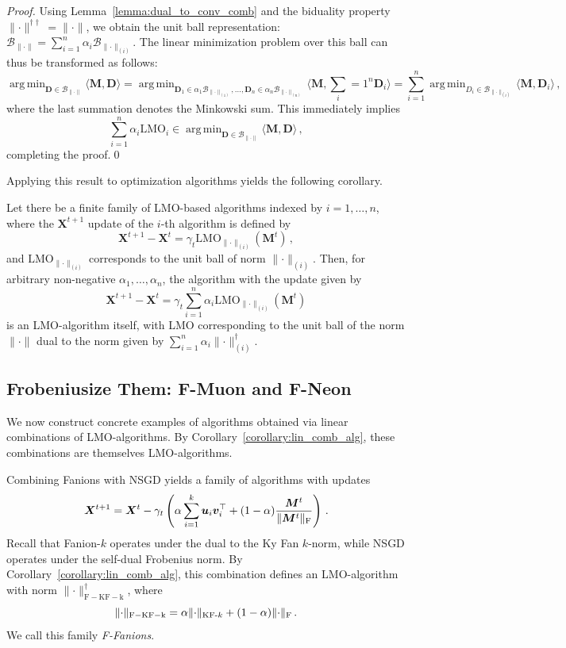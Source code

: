 \documentclass[smallextended,referee,envcountsect]{svjour3}
\def\vu{{\bm{u}}}
\def\vv{{\bm{v}}}
\def\mD{{\bm{D}}}
\def\mM{{\bm{M}}}
\def\mX{{\bm{X}}}
\DeclareMathOperator*{\argmin}{arg\,min}
\newcommand{\cB}{\mathcal{B}}
\newcommand{\norm}[1]{\lVert #1\rVert}
\DeclarePairedDelimiter{\normf}{\|}{\|_\mathrm{F}}
\DeclarePairedDelimiter{\normkfk}{\|}{\|_{\text{KF-}k}}
\def\<#1,#2>{\langle #1,#2\rangle}
\newcommand{\lemmaref}[1]{Lemma~\ref{#1}}
\newcommand{\corollaryref}[1]{Corollary~\ref{#1}}
\begin{document}
 \begin{proof}
   Using \lemmaref{lemma:dual_to_conv_comb} and the biduality property $\norm{\cdot}^{\dagger \dagger} = \norm{\cdot}$, we obtain the unit ball representation: $\cB_{\norm{\cdot}} = \sum_{i = 1}^n \alpha_i \cB_{\norm{\cdot}_{(i)}}$. The linear minimization problem over this ball can thus be transformed as follows:
   \[
   \argmin_{\mD \in \cB_{\norm{\cdot}}}\<\mM, \mD> = \argmin_{\mD_1 \in \alpha_1 \cB_{\norm{\cdot}_{(1)}}, \dots, \mD_n \in \alpha_n\cB_{\norm{\cdot}_{(n)}}}\<\mM, \sum_{i = 1}^n\mD_i> = \sum_{i = 1}^n \argmin_{D_i \in \cB_{\norm{\cdot}_{(i)}}}\<\mM, \mD_i>\,,
   \]
   where the last summation denotes the Minkowski sum. This immediately implies 
   \[
   \sum_{i = 1}^n \alpha_i \mathrm{LMO}_{i} \in \argmin_{\mD \in \cB_{\norm{\cdot}}}\<\mM, \mD>\,,
   \] 
   completing the proof.\qed
\end{proof}
 
 Applying this result to optimization algorithms yields the following corollary.
 
 \begin{corollary}\label{corollary:lin_comb_alg}
  Let there be a finite family of LMO-based algorithms indexed by $i = 1, \dots, n$, where the $\mX^{t + 1}$ update of the $i$-th algorithm is defined by
  \[
  \mX^{t + 1} - \mX^{t} = \gamma_t \mathrm{LMO}_{\norm{\cdot}_{(i)}}(\mM^{t})\,,
  \]
  and $\mathrm{LMO}_{\norm{\cdot}_{(i)}}$ corresponds to the unit ball of norm $\norm{\cdot}_{(i)}$. Then, for arbitrary non-negative $\alpha_1, \dots, \alpha_n$, the algorithm with the update given by
  \[
  \mX^{t + 1} - \mX^{t} = \gamma_t \sum_{i = 1}^n \alpha_i \mathrm{LMO}_{\norm{\cdot}_{(i)}}(\mM^t)
  \]
  is an LMO-algorithm itself, with LMO corresponding to the unit ball of the norm $\norm{\cdot}$ dual to the norm given by $\sum_{i = 1}^n \alpha_i \norm{\cdot}_{(i)}^\dagger$.
\end{corollary}
 
 \subsection{Frobeniusize Them: F-Muon and F-Neon}
 We now construct concrete examples of algorithms obtained via linear combinations of LMO-algorithms. By \corollaryref{corollary:lin_comb_alg}, these combinations are themselves LMO-algorithms.
 
 Combining Fanions with NSGD yields a family of algorithms with updates
 \begin{equation}\label{eq:nsgd_muon_update}
     \mX^{t+1} = \mX^{t} - \gamma_t \left(\alpha \sum_{i = 1}^k \vu_i \vv_i^\top + (1-\alpha)\frac{\mM^t}{\normf{\mM^t}}\right)\,.
 \end{equation}
 Recall that Fanion-$k$ operates under the dual to the Ky Fan $k$-norm, while NSGD operates under the self-dual Frobenius norm. By \corollaryref{corollary:lin_comb_alg}, this combination defines an LMO-algorithm with norm $\norm{\cdot}_{\mathrm{F-KF-k}}^\dagger$, where
 \begin{equation}\label{eq:fkfk_norm}
   \norm{\cdot}_{\mathrm{F-KF-k}} = \alpha \normkfk{\cdot} + (1-\alpha)\normf{\cdot}\,.
 \end{equation}
 We call this family \emph{F-Fanions}.
 
\end{document}
